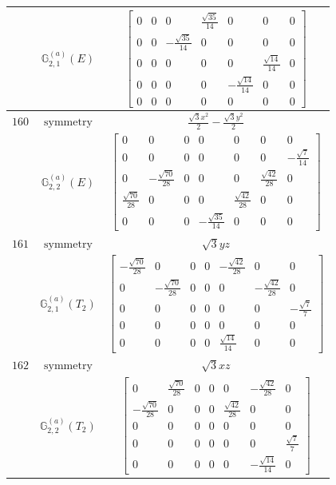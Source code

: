 \documentclass[fleqn,8pt,landscape]{jsarticle}
\begin{document}
\begin{longtable}{ccc}
$  $ & $ \mathbb{G}_{2,1}^{(a)}(E) $ & $ \begin{bmatrix} 0 & 0 & 0 & \frac{\sqrt{35}}{14} & 0 & 0 & 0 \\ 0 & 0 & - \frac{\sqrt{35}}{14} & 0 & 0 & 0 & 0 \\ 0 & 0 & 0 & 0 & 0 & \frac{\sqrt{14}}{14} & 0 \\ 0 & 0 & 0 & 0 & - \frac{\sqrt{14}}{14} & 0 & 0 \\ 0 & 0 & 0 & 0 & 0 & 0 & 0 \end{bmatrix} $ \\ \hline
$ 160 $ & $ \text{symmetry} $ & $ \frac{\sqrt{3} x^{2}}{2} - \frac{\sqrt{3} y^{2}}{2} $ \\
$  $ & $ \mathbb{G}_{2,2}^{(a)}(E) $ & $ \begin{bmatrix} 0 & 0 & 0 & 0 & 0 & 0 & 0 \\ 0 & 0 & 0 & 0 & 0 & 0 & - \frac{\sqrt{7}}{14} \\ 0 & - \frac{\sqrt{70}}{28} & 0 & 0 & 0 & \frac{\sqrt{42}}{28} & 0 \\ \frac{\sqrt{70}}{28} & 0 & 0 & 0 & \frac{\sqrt{42}}{28} & 0 & 0 \\ 0 & 0 & 0 & - \frac{\sqrt{35}}{14} & 0 & 0 & 0 \end{bmatrix} $ \\ \hline
$ 161 $ & $ \text{symmetry} $ & $ \sqrt{3} y z $ \\
$  $ & $ \mathbb{G}_{2,1}^{(a)}(T_{2}) $ & $ \begin{bmatrix} - \frac{\sqrt{70}}{28} & 0 & 0 & 0 & - \frac{\sqrt{42}}{28} & 0 & 0 \\ 0 & - \frac{\sqrt{70}}{28} & 0 & 0 & 0 & - \frac{\sqrt{42}}{28} & 0 \\ 0 & 0 & 0 & 0 & 0 & 0 & - \frac{\sqrt{7}}{7} \\ 0 & 0 & 0 & 0 & 0 & 0 & 0 \\ 0 & 0 & 0 & 0 & \frac{\sqrt{14}}{14} & 0 & 0 \end{bmatrix} $ \\ \hline
$ 162 $ & $ \text{symmetry} $ & $ \sqrt{3} x z $ \\
$  $ & $ \mathbb{G}_{2,2}^{(a)}(T_{2}) $ & $ \begin{bmatrix} 0 & \frac{\sqrt{70}}{28} & 0 & 0 & 0 & - \frac{\sqrt{42}}{28} & 0 \\ - \frac{\sqrt{70}}{28} & 0 & 0 & 0 & \frac{\sqrt{42}}{28} & 0 & 0 \\ 0 & 0 & 0 & 0 & 0 & 0 & 0 \\ 0 & 0 & 0 & 0 & 0 & 0 & \frac{\sqrt{7}}{7} \\ 0 & 0 & 0 & 0 & 0 & - \frac{\sqrt{14}}{14} & 0 \end{bmatrix} $ \\ \hline

\end{longtable}
\end{document}
